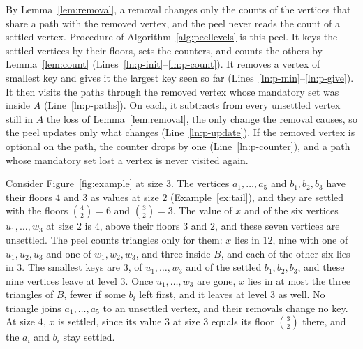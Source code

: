 By Lemma~\ref{lem:removal}, a removal changes only the counts of the vertices that share a path with the removed vertex, and the peel never reads the count of a settled vertex.
%
Procedure  of Algorithm~\ref{alg:peellevels} is this peel.
%
It keys the settled vertices by their floors, sets the counters, and counts the others by Lemma~\ref{lem:count} (Lines~\ref{ln:p-init}--\ref{ln:p-count}).
%
It removes a vertex of smallest key and gives it the largest key seen so far (Lines~\ref{ln:p-min}--\ref{ln:p-give}).
%
It then visits the paths through the removed vertex whose mandatory set was inside $A$ (Line~\ref{ln:p-paths}).
%
On each, it subtracts from every unsettled vertex still in $A$ the loss of Lemma~\ref{lem:removal}, the only change the removal causes, so the peel updates only what changes (Line~\ref{ln:p-update}).
%
If the removed vertex is optional on the path, the counter drops by one (Line~\ref{ln:p-counter}), and a path whose mandatory set lost a vertex is never visited again.
\begin{example}\label{ex:settled}
Consider Figure~\ref{fig:example} at size $3$.
%
The vertices $a_1,\dots,a_5$ and $b_1,b_2,b_3$ have their floors $4$ and $3$ as values at size $2$ (Example~\ref{ex:tail}), and they are settled with the floors $\binom{4}{2}=6$ and $\binom{3}{2}=3$.
%
The value of $x$ and of the six vertices $u_1,\dots,w_3$ at size $2$ is $4$, above their floors $3$ and $2$, and these seven vertices are unsettled.
%
The peel counts triangles only for them: $x$ lies in $12$, nine with one of $u_1,u_2,u_3$ and one of $w_1,w_2,w_3$, and three inside $B$, and each of the other six lies in $3$.
%
The smallest keys are $3$, of $u_1,\dots,w_3$ and of the settled $b_1,b_2,b_3$, and these nine vertices leave at level $3$.
%
Once $u_1,\dots,w_3$ are gone, $x$ lies in at most the three triangles of $B$, fewer if some $b_i$ left first, and it leaves at level $3$ as well.
%
No triangle joins $a_1,\dots,a_5$ to an unsettled vertex, and their removals change no key.
%
At size $4$, $x$ is settled, since its value $3$ at size $3$ equals its floor $\binom{3}{2}$ there, and the $a_i$ and $b_i$ stay settled.
\end{example}

